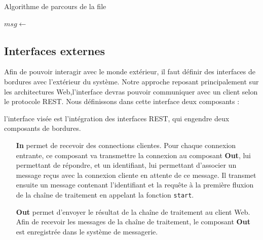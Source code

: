 \begin{algorithm}
\caption{Algorithme de parcours de la file}
\label{alg:parcours}
\begin{algorithmic}
\State $msg \gets$  
\State {}
\EndWhile
\EndFunction
\end{algorithmic}
\end{algorithm}

\subsection{Interfaces externes}

Afin de pouvoir interagir avec le monde extérieur, il faut définir des interfaces de bordures avec l'extérieur du système.
Notre approche reposant principalement sur les architectures Web,l'interface devras pouvoir communiquer avec un client selon le protocole REST.
Nous définissons dans cette interface deux composants :


 l'interface visée est l'intégration des interfaces REST, qui engendre deux composants de bordures.


\begin{itemize}
	\item[\textbf{In}]
    permet de recevoir des connections clientes.
    Pour chaque connexion entrante, ce composant va transmettre la connexion au composant \textbf{Out}, lui permettant de répondre, et un identifiant, lui permettant d'associer un message reçus avec la connexion cliente en attente de ce message.
    Il transmet ensuite un message contenant l'identifiant et la requête à la première fluxion de la chaîne de traitement en appelant la fonction \texttt{start}.
	\item[\textbf{Out}]
    permet d'envoyer le résultat de la chaîne de traitement au client Web.
    Afin de recevoir les messages de la chaîne de traitement, le composant \textbf{Out} est enregistrée dans le système de messagerie.
\end{itemize}


